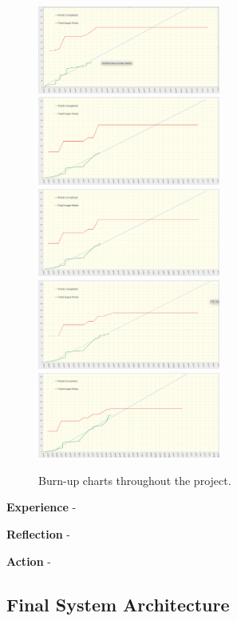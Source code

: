   \begin{figure}[H]
    \centering
    \includegraphics[width=6cm]{assets/outputs/burnups/01-16.png}
    \includegraphics[width=6cm]{assets/outputs/burnups/01-30.png}
    \includegraphics[width=6cm]{assets/outputs/burnups/02-05.png}
    \includegraphics[width=6cm]{assets/outputs/burnups/02-14.png}
    \includegraphics[width=6cm]{assets/outputs/burnups/02-27.png}
    \caption{Burn-up charts throughout the project.}
    \label{fig:burnups}
  \end{figure}

  \textbf{Experience} -

  \textbf{Reflection} -

  \textbf{Action} -

  \newpage
  \subsection{Final System Architecture}


